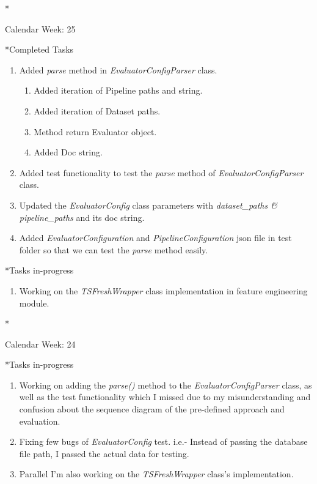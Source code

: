\documentclass[11pt,a4paper]{article}
\begin{document}
\newpage
\begin{section}*{Calendar Week: 25 \hfill \date{25 June, 2021}}
 \begin{subsection}*{Completed Tasks}
     \begin{enumerate}
         \item Added \textit{parse} method in \textit {EvaluatorConfigParser} class.
               \begin{enumerate}
                   \item Added iteration of Pipeline paths and string.
                   \item Added iteration of Dataset paths.
                   \item Method return Evaluator object.
                   \item Added Doc string.
               \end{enumerate}
         \item Added test functionality to test the \textit{parse} method of \textit{EvaluatorConfigParser} class.
         \item Updated the \textit{EvaluatorConfig} class parameters with \textit{dataset\_paths \& pipeline\_paths} and its doc string.
         \item Added \textit{EvaluatorConfiguration} and \textit{PipelineConfiguration} json file in test folder so that we can test the \textit{parse} method easily.
     \end{enumerate}
 \end{subsection}
 \begin{subsection}*{Tasks in-progress}
     \begin{enumerate}
         \item Working on the \textit{TSFreshWrapper} class implementation in feature engineering module.
     \end{enumerate}
 \end{subsection}
\end{section}

\newpage
\begin{section}*{Calendar Week: 24 \hfill \date{18 June, 2021}}
 \begin{subsection}*{Tasks in-progress}
     \begin{enumerate}
         \item Working on adding the \textit{parse()} method to the \textit{EvaluatorConfigParser} class, as well as the test functionality which I missed due to my misunderstanding and confusion about the sequence diagram of the pre-defined approach and evaluation.
         \item Fixing few bugs of \textit{EvaluatorConfig} test. i.e.- Instead of passing the database file path, I passed the actual data for testing.
         \item Parallel I'm also working on the \textit{TSFreshWrapper} class's implementation.
     \end{enumerate}
 \end{subsection}
\end{section}
\end{document}
